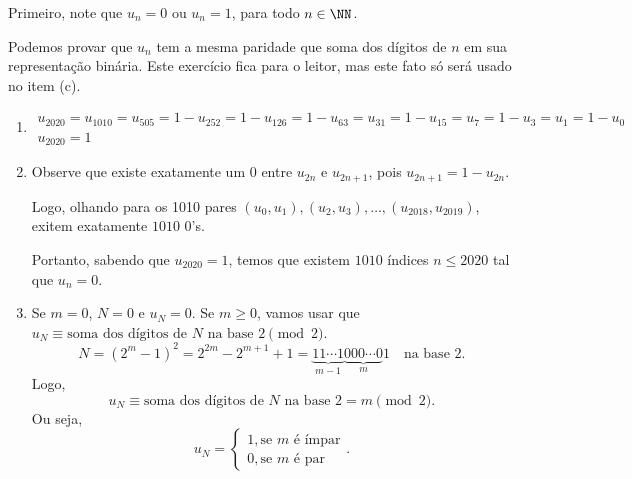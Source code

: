 Primeiro, note que $u_n = 0$ ou $u_n = 1$, para todo $n \in \NN$.

Podemos provar que $u_n$ tem a mesma paridade que soma dos dígitos de $n$ em sua representação binária. Este exercício fica para o leitor, mas este fato só será usado no item (c).

\begin{enumerate}[label = (\alph*)]
	\item
		\begin{gather*}
			u_{2020} = u_{1010}
					 = u_{505}
					 = 1 - u_{252}
					 = 1 - u_{126}
					 = 1 - u_{63}
					 = u_{31}
					 = 1 - u_{15}
					 = u_{7}
					 = 1 - u_{3}
					 = u_{1}
					 = 1 - u_0\\
			u_{2020} = 1
		\end{gather*}
	\item
		Observe que existe exatamente um $0$ entre $u_{2n}$ e $u_{2n+1}$, pois $u_{2n+1} = 1 - u_{2n}$.

		Logo, olhando para os 1010 pares $(u_0, u_1), (u_2, u_3), \dots, (u_{2018}, u_{2019})$, exitem exatamente $1010$ $0$'s.

		Portanto, sabendo que $u_{2020} = 1$, temos que existem $1010$ índices $n \le 2020$ tal que $u_n = 0$.

	\item
		Se $m = 0$, $N = 0$ e $u_N = 0$. Se $m \geq 0$, vamos usar que $u_N \equiv \text{soma dos dígitos de $N$ na base $2$} \pmod{2}$.
		\[N = (2^m - 1)^2 = 2^{2m} - 2^{m+1} + 1 = \underbrace{11\cdots1}_{\text{$m-1$}}\underbrace{000\cdots0}_{\text{$m$}}1\quad\text{na base $2$.}\]
		Logo, \[u_N \equiv \text{soma dos dígitos de $N$ na base $2$} = m \pmod{2}.\]
		Ou seja, \[ u_N = 
			\begin{cases}
				1, \text{se $m$ é ímpar}\\
				0, \text{se $m$ é par}
			\end{cases}.\]
\end{enumerate}
